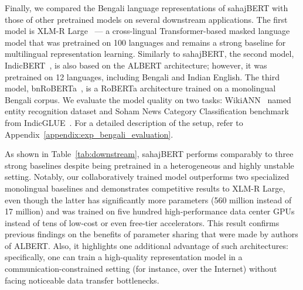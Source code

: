 Finally, we compared the Bengali language representations of sahajBERT with those of other pretrained models on several downstream applications. The first model is XLM-R Large~\cite{xlmr} --- a cross-lingual Transformer-based masked language model that was pretrained on 100 languages and remains a strong baseline for multilingual representation learning. Similarly to sahajBERT, the second model, IndicBERT~\cite{kakwani-etal-2020-indicnlpsuite}, is also based on the ALBERT architecture; however, it was pretrained on 12 languages, including Bengali and Indian English. The third model, bnRoBERTa~\cite{jain2020indictransformers}, is a RoBERTa architecture trained on a monolingual Bengali corpus. We evaluate the model quality on two tasks: WikiANN~\cite{pan-etal-2017-cross} named entity recognition dataset and Soham News Category Classification benchmark from IndicGLUE~\cite{kakwani-etal-2020-indicnlpsuite}. For a detailed description of the setup, refer to Appendix~\ref{appendix:exp_bengali_evaluation}.

As shown in Table~\ref{tab:downstream}, sahajBERT performs comparably to three strong baselines despite being pretrained in a heterogeneous and highly unstable setting.
Notably, our collaboratively trained model outperforms two specialized monolingual baselines and demonstrates competitive results to XLM-R Large, even though the latter has significantly more parameters (560 million instead of 17 million) and was trained on five hundred high-performance data center GPUs instead of tens of low-cost or even free-tier accelerators.
This result confirms previous findings on the benefits of parameter sharing  that were made by authors of ALBERT. Also, it highlights one additional advantage of such architectures: specifically, one can train a high-quality representation model in a communication-constrained setting (for instance, over the Internet) without facing noticeable data transfer bottlenecks.